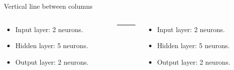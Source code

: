 
\begin{frame}{Vertical line between columns}
    \begin{columns}
        \begin{column}{0.49\textwidth}
        
        \begin{itemize}
            \item Input layer: 2 neurons.
            \item Hidden layer: 5 neurons.
            \item Output layer: 2 neurons.
        \end{itemize}
        
        \end{column}
    
        \begin{column}{.02\textwidth}
            \rule{.1mm}{0.7\textheight}
        \end{column}
    
        \begin{column}{0.49\textwidth}
            \begin{itemize}
                \item Input layer: 2 neurons.
                \item Hidden layer: 5 neurons.
                \item Output layer: 2 neurons.
            \end{itemize}
        \end{column}
        
    \end{columns}
\end{frame}